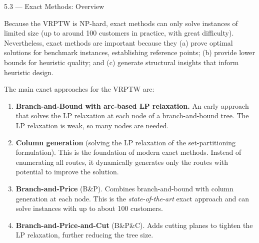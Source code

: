 \documentclass[aspectratio=169,10pt]{beamer}
\begin{document}
\begin{frame}[allowframebreaks]{5.3 --- Exact Methods: Overview}

Because the VRPTW is NP-hard, exact methods can only solve instances of limited
size (up to around 100 customers in practice, with great difficulty).  Nevertheless,
exact methods are important because they (a) prove optimal solutions for benchmark
instances, establishing reference points; (b) provide lower bounds for heuristic
quality; and (c) generate structural insights that inform heuristic design.

\medskip
The main exact approaches for the VRPTW are:

\begin{enumerate}
  \item \textbf{Branch-and-Bound with arc-based LP relaxation.}  An early approach
    that solves the LP relaxation at each node of a branch-and-bound tree.  The LP
    relaxation is weak, so many nodes are needed.

  \item \textbf{Column generation} (solving the LP relaxation of the set-partitioning
    formulation).  This is the foundation of modern exact methods.  Instead of
    enumerating all routes, it dynamically generates only the routes with potential
    to improve the solution.

  \item \textbf{Branch-and-Price} (B\&P).  Combines branch-and-bound with column
    generation at each node.  This is the \emph{state-of-the-art} exact approach
    and can solve instances with up to about 100 customers.

  \item \textbf{Branch-and-Price-and-Cut} (B\&P\&C).  Adds cutting planes to
    tighten the LP relaxation, further reducing the tree size.
\end{enumerate}

\end{frame}
\end{document}
